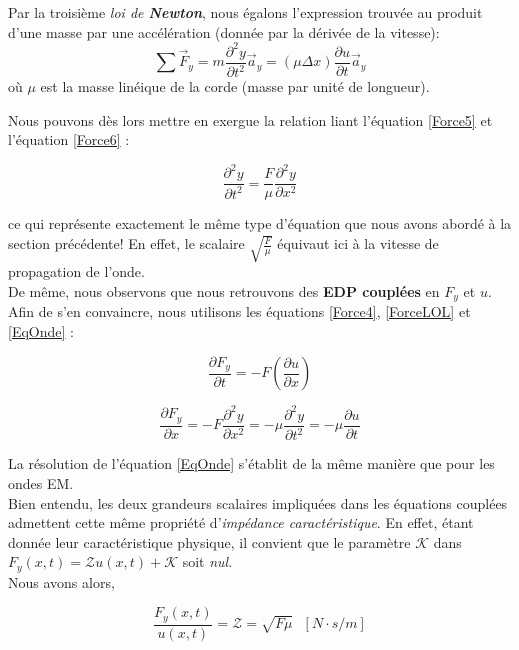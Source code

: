 Par la troisième \textit{loi de \textbf{Newton}}, nous égalons l'expression trouvée au produit d'une masse par une accélération (donnée par la dérivée de la vitesse):
\begin{equation}
\sum \vec{F}_{y}  = m \frac{\partial^{2} y }{\partial t^{2}} \vec{a}_{y} =  (\mu \Delta x) \frac{\partial u }{\partial t} \vec{a}_{y}  
\label{Force6}
\end{equation}
où $\mu$ est la masse linéique de la corde (masse par unité de longueur).

Nous pouvons dès lors mettre en exergue la relation liant l'équation \eqref{Force5} et l'équation \eqref{Force6} : 

\begin{equation}
\frac{\partial^{2} y }{\partial t^{2}} = \frac{F}{\mu}  \frac{\partial^{2} y }{\partial x^{2}}
\label{EqOnde}
\end{equation}

ce qui représente exactement le même type d'équation que nous avons abordé à la section précédente! 
En effet, le scalaire $\sqrt{\frac{F}{\mu}}$ équivaut ici à la vitesse de propagation de l'onde.  \\
De même, nous observons que nous retrouvons des \textbf{EDP couplées} en $F_{y}$ et $u$. \\
Afin de s'en convaincre, nous utilisons les équations \eqref{Force4}, \eqref{ForceLOL} et \eqref{EqOnde} :

\[ \frac{\partial F_{y}}{\partial t} = - F (\frac{\partial u}{\partial x})\]

\[ \frac{\partial F_{y}}{\partial x} = -F \frac{\partial^{2} y}{\partial x^{2}} = -\mu \frac{\partial^{2} y}{\partial t^{2}} = -\mu \frac{\partial u}{\partial t} \]

La résolution de l'équation \eqref{EqOnde} s'établit de la même manière que pour les ondes EM. \\ 
Bien entendu, les deux grandeurs scalaires impliquées dans les équations couplées admettent cette même propriété
d'\textit{impédance caractéristique}. En effet, étant donnée leur caractéristique physique, il convient que le paramètre $\mathcal{K}$ 
dans $F_{y}(x,t) = \mathcal{Z}u(x,t) + \mathcal{K}$ soit \textit{nul}. \\ 
Nous avons alors, 

\[\frac{F_{y}(x,t)}{u(x,t)} = \mathcal{Z} = \sqrt{F\mu} \hspace{8pt} [N\cdot s / m]\]

